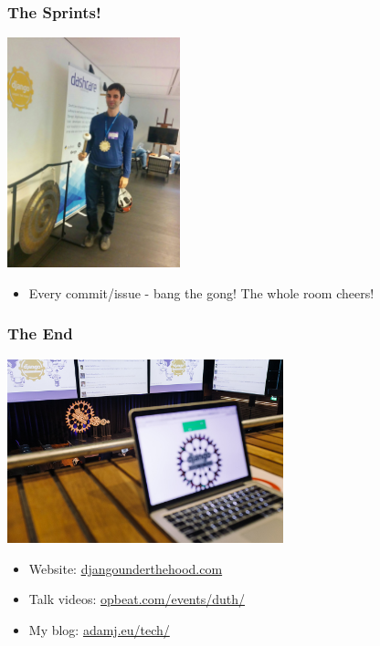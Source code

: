 \documentclass{beamer}
\begin{document}
\begin{frame}[fragile]\frametitle{The Sprints!}

    \begin{center}
        \includegraphics[width=5cm]{duth-sprints-lukasz-gong}
    \end{center}

    \begin{itemize}
        \item Every commit/issue - bang the gong! The whole room cheers!
    \end{itemize}

\end{frame}


\begin{frame}[fragile]\frametitle{The End}

    \begin{center}
        \includegraphics[width=8cm]{duth-the-end}
    \end{center}

    \begin{itemize}
        \item Website: \url{djangounderthehood.com}
        \item Talk videos: \url{opbeat.com/events/duth/}
        \item My blog: \url{adamj.eu/tech/}
    \end{itemize}

\end{frame}
\end{document}
